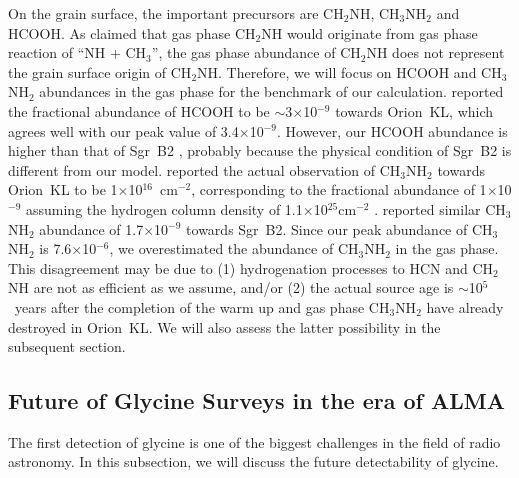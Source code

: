 \documentclass{aastex61}
\begin{document}
On the grain surface, the important precursors are CH$_2$NH, CH$_3$NH$_2$ and HCOOH.
%
As \cite{Suzuki16} claimed that gas phase CH$_2$NH would originate from gas phase reaction of ``NH + CH$_3$'', the gas phase abundance of CH$_2$NH does not represent the grain surface origin of CH$_2$NH.
%
Therefore, we will focus on HCOOH and CH$_3$NH$_2$ abundances in the gas phase for the benchmark of our calculation.
%
\cite{Liu02} reported the fractional abundance of HCOOH to be $\sim$3$\times$10$^{-9}$ towards Orion~KL, which agrees well with our peak value of 3.4$\times$10$^{-9}$.
%
However, our HCOOH abundance is higher than that of Sgr~B2 \citep{Ikeda01}, probably because the physical condition of Sgr~B2 is different from our model.
%
\cite{Pagani17} reported the actual observation of CH$_3$NH$_2$ towards Orion~KL to be 1$\times$10$^{16}$~cm$^{-2}$, corresponding to the fractional abundance of 1$\times$10$^{-9}$ assuming the hydrogen column density of 1.1$\times$10$^{25}$cm$^{-2}$ \citep{Hirota15}.
%
\cite{Halfen13} reported similar CH$_3$NH$_2$ abundance of 1.7$\times$10$^{-9}$ towards Sgr~B2.
%
Since our peak abundance of CH$_3$NH$_2$ is 7.6$\times$10$^{-6}$, we overestimated the abundance of CH$_3$NH$_2$ in the gas phase.
%
This disagreement may be due to (1) hydrogenation processes to HCN and CH$_2$NH are not as efficient as we assume, and/or (2) the actual source age is $\sim$10$^5$~years after the completion of the warm up and gas phase CH$_3$NH$_2$ have already destroyed in Orion~KL.
%
We will also assess the latter possibility in the subsequent section.



\subsection{Future of Glycine Surveys in the era of ALMA}
The first detection of glycine is one of the biggest challenges in the field of radio astronomy.
%
In this subsection, we will discuss the future detectability of glycine.
\end{document}
